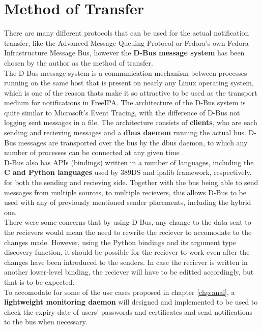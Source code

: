 \section{Method of Transfer}

There are many different protocols that can be used for the actual notification transfer, like the Advanced Message Queuing Protocol or Fedora's own Fedora Infrastructure Message Bus,
however the \textbf{D-Bus message system} has been chosen by the author as the method of transfer.\\
The D-Bus message system is a communication mechanism between processes running on the same host that is present on nearly any Linux operating system,
which is one of the reason thats make it so attractive to be used as the transport medium for notifications in FreeIPA.
The architecture of the D-Bus system is quite similar to Microsoft's Event Tracing, with the difference of D-Bus not logging sent messages in a file.
The architecture consists of \textbf{clients}, who are each sending and recieving messages and a \textbf{dbus daemon} running the actual bus.
D-Bus messages are transported over the bus by the dbus daemon, to which any number of processes can be connected at any given time \cite{dbusWeb}. \\
D-Bus also has APIs (bindings) written in a number of languages, including the \textbf{C and Python languages} used by 389DS and ipalib framework, respectively, for both the sending and recieving side.
Together with the bus being able to send messages from multiple sources, to multiple recievers, this allows D-Bus to be used with any of previously mentioned sender placements, including the hybrid one. \\
There were some concerns that by using D-Bus, any change to the data sent to the recievers would mean the need to rewrite the reciever to accomodate to the changes made.
However, using the Python bindings and its argument type discovery function, it should be possible for the reciever to work even after the changes have been introduced to the senders.
In case the reciever is written in another lower-level binding, the reciever will have to be editted accordingly, but that is to be expected. \\
To accomodate for some of the use cases proposed in chapter \ref{chp:anal}, a \textbf{lightweight monitoring daemon} will designed and implemented to be used to check the expiry date of users' passwords and certificates
and send notifications to the bus when necessary. \\

